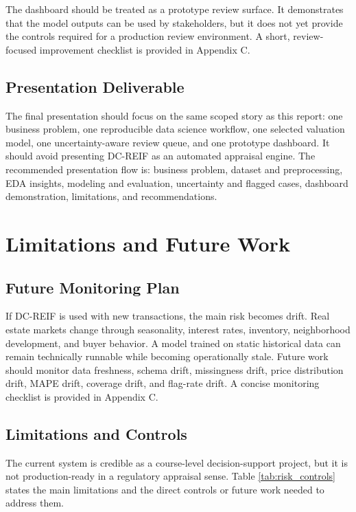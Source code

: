 \documentclass[12pt,a4paper]{article}
\begin{document}
The dashboard should be treated as a prototype review surface. It demonstrates that the model outputs can be used by stakeholders, but it does not yet provide the controls required for a production review environment. A short, review-focused improvement checklist is provided in Appendix C.

\subsection{Presentation Deliverable}
The final presentation should focus on the same scoped story as this report: one business problem, one reproducible data science workflow, one selected valuation model, one uncertainty-aware review queue, and one prototype dashboard. It should avoid presenting DC-REIF as an automated appraisal engine. The recommended presentation flow is: business problem, dataset and preprocessing, EDA insights, modeling and evaluation, uncertainty and flagged cases, dashboard demonstration, limitations, and recommendations.

\section{Limitations and Future Work}

\subsection{Future Monitoring Plan}
If DC-REIF is used with new transactions, the main risk becomes drift. Real estate markets change through seasonality, interest rates, inventory, neighborhood development, and buyer behavior. A model trained on static historical data can remain technically runnable while becoming operationally stale. Future work should monitor data freshness, schema drift, missingness drift, price distribution drift, MAPE drift, coverage drift, and flag-rate drift. A concise monitoring checklist is provided in Appendix C.

\subsection{Limitations and Controls}
The current system is credible as a course-level decision-support project, but it is not production-ready in a regulatory appraisal sense. Table \ref{tab:risk_controls} states the main limitations and the direct controls or future work needed to address them.
\end{document}
